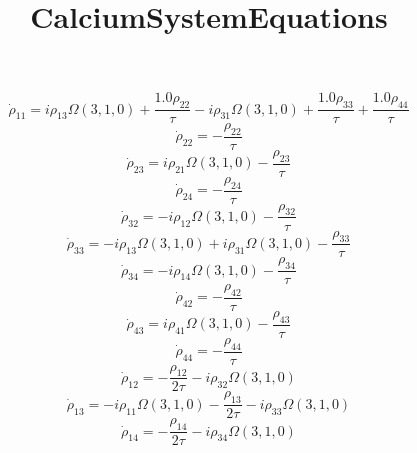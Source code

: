 \documentclass{article}
\begin{document}
\title{CalciumSystemEquations}
\maketitle
\begin{equation}
\dot{\rho}_{11} = i \rho_{13} \Omega{\left(3,1,0 \right)} + \frac{1.0 \rho_{22}}{\tau} - i \rho_{31} \Omega{\left(3,1,0 \right)} + \frac{1.0 \rho_{33}}{\tau} + \frac{1.0 \rho_{44}}{\tau}
\end{equation}
\begin{equation}
\dot{\rho}_{22} = - \frac{\rho_{22}}{\tau}
\end{equation}
\begin{equation}
\dot{\rho}_{23} = i \rho_{21} \Omega{\left(3,1,0 \right)} - \frac{\rho_{23}}{\tau}
\end{equation}
\begin{equation}
\dot{\rho}_{24} = - \frac{\rho_{24}}{\tau}
\end{equation}
\begin{equation}
\dot{\rho}_{32} = - i \rho_{12} \Omega{\left(3,1,0 \right)} - \frac{\rho_{32}}{\tau}
\end{equation}
\begin{equation}
\dot{\rho}_{33} = - i \rho_{13} \Omega{\left(3,1,0 \right)} + i \rho_{31} \Omega{\left(3,1,0 \right)} - \frac{\rho_{33}}{\tau}
\end{equation}
\begin{equation}
\dot{\rho}_{34} = - i \rho_{14} \Omega{\left(3,1,0 \right)} - \frac{\rho_{34}}{\tau}
\end{equation}
\begin{equation}
\dot{\rho}_{42} = - \frac{\rho_{42}}{\tau}
\end{equation}
\begin{equation}
\dot{\rho}_{43} = i \rho_{41} \Omega{\left(3,1,0 \right)} - \frac{\rho_{43}}{\tau}
\end{equation}
\begin{equation}
\dot{\rho}_{44} = - \frac{\rho_{44}}{\tau}
\end{equation}
\begin{equation}
\dot{\rho}_{12} = - \frac{\rho_{12}}{2 \tau} - i \rho_{32} \Omega{\left(3,1,0 \right)}
\end{equation}
\begin{equation}
\dot{\rho}_{13} = - i \rho_{11} \Omega{\left(3,1,0 \right)} - \frac{\rho_{13}}{2 \tau} - i \rho_{33} \Omega{\left(3,1,0 \right)}
\end{equation}
\begin{equation}
\dot{\rho}_{14} = - \frac{\rho_{14}}{2 \tau} - i \rho_{34} \Omega{\left(3,1,0 \right)}
\end{equation}
\end{document}
